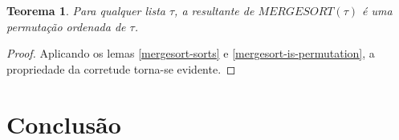 \documentclass[12pt]{article}
\newtheorem{theorem}{Teorema}[section]
\theoremstyle{definition}
\begin{document}
\begin{theorem}
\label{mergesort-is-correct}
        Para qualquer lista $\tau$, a resultante de $MERGESORT(\tau)$ é uma permutação ordenada de $\tau$.
\end{theorem}

\begin{proof}
        Aplicando os lemas \ref{mergesort-sorts} e \ref{mergesort-is-permutation}, a propriedade da corretude torna-se
        evidente.
\end{proof}



\section{Conclusão}
\label{conclusion}



\end{document}
